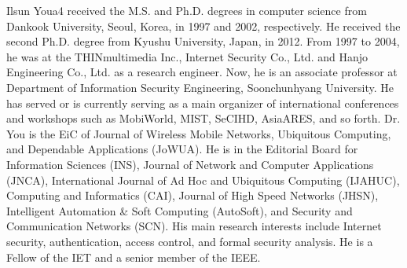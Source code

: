 \documentclass{easychair}
\begin{document}
\vspace*{3.5em}
\begin{biography}{Ilsun You}{a4} received the M.S. and Ph.D. degrees in computer science from Dankook University, Seoul, Korea, in 1997 and 2002, respectively. He received the second Ph.D. degree from Kyushu University, Japan, in 2012. From 1997 to 2004, he was at the THINmultimedia Inc., Internet Security Co., Ltd. and Hanjo Engineering Co., Ltd. as a research engineer. Now, he is an associate professor at Department of Information Security Engineering, Soonchunhyang University. He has served or is currently serving as a main organizer of international conferences and workshops such as MobiWorld, MIST, SeCIHD, AsiaARES, and so forth. Dr. You is the EiC of Journal of Wireless Mobile Networks, Ubiquitous Computing, and Dependable Applications (JoWUA). He is in the Editorial Board for Information Sciences (INS), Journal of Network and Computer Applications (JNCA), International Journal of Ad Hoc and Ubiquitous Computing (IJAHUC), Computing and Informatics (CAI), Journal of High Speed Networks (JHSN), Intelligent Automation \& Soft Computing (AutoSoft), and Security and Communication Networks (SCN). His main research interests include Internet security, authentication, access control, and formal security analysis. He is a Fellow of the IET and a senior member of the IEEE.
\end{biography}
\vspace*{0.5em}

\end{document}
